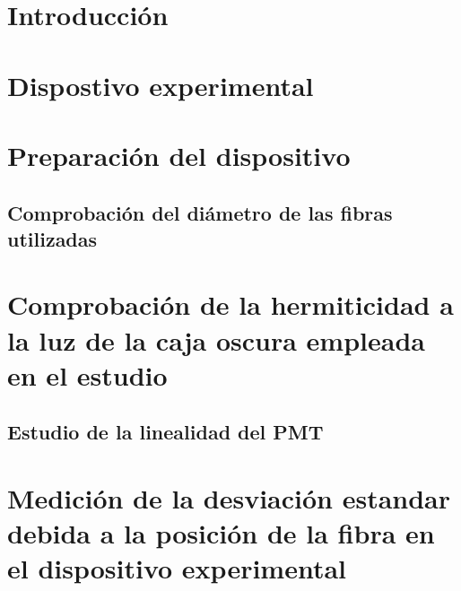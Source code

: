\documentclass[11pt,a4paper]{article}
\begin{document}


\tableofcontents
\newpage


\section{Introducción} \label{sec:Introduccion}


\section{Dispostivo experimental} \label{sec:SetUp}


\section{Preparación del dispositivo} \label{sec:Preparacion}


	\subsection{Comprobación del diámetro de las fibras utilizadas} \label{sec:Diametro}
	
	
	\section{Comprobación de la hermiticidad a la luz de la caja oscura empleada en el estudio} 		\label{sec:manta}
	

	\subsection{Estudio de la linealidad del PMT} \label{sec:Linealidad}
	
					
\section{Medición de la desviación estandar debida a la posición de la fibra en el dispositivo experimental} \label{sec:sigmapos}


\end{document}
